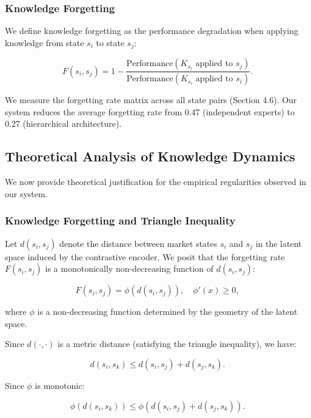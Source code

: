 \documentclass[review]{elsarticle}
\begin{document}
\subsubsection{Knowledge Forgetting}

We define knowledge forgetting as the performance degradation when applying knowledge from state $s_i$ to state $s_j$:

\begin{equation}
F(s_i, s_j) = 1 - \frac{\text{Performance}(K_{s_i} \text{ applied to } s_j)}{\text{Performance}(K_{s_i} \text{ applied to } s_i)}.
\end{equation}

We measure the forgetting rate matrix across all state pairs (Section 4.6). Our system reduces the average forgetting rate from 0.47 (independent experts) to 0.27 (hierarchical architecture).

\subsection{Theoretical Analysis of Knowledge Dynamics}

We now provide theoretical justification for the empirical regularities observed in our system.

\subsubsection{Knowledge Forgetting and Triangle Inequality}

Let $d(s_i, s_j)$ denote the distance between market states $s_i$ and $s_j$ in the latent space induced by the contrastive encoder. We posit that the forgetting rate $F(s_i, s_j)$ is a monotonically non-decreasing function of $d(s_i, s_j)$:

\begin{equation}
F(s_i, s_j) = \phi(d(s_i, s_j)), \quad \phi'(x) \ge 0,
\end{equation}

where $\phi$ is a non-decreasing function determined by the geometry of the latent space.

Since $d(\cdot, \cdot)$ is a metric distance (satisfying the triangle inequality), we have:

\begin{equation}
d(s_i, s_k) \le d(s_i, s_j) + d(s_j, s_k).
\end{equation}

Since $\phi$ is monotonic:

\begin{equation}
\phi(d(s_i, s_k)) \le \phi(d(s_i, s_j) + d(s_j, s_k)).
\end{equation}
\end{document}
